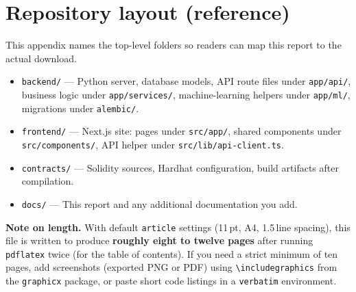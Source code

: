 \documentclass[11pt,a4paper]{article}
\begin{document}
\appendix
\section{Repository layout (reference)}
This appendix names the top-level folders so readers can map this report to the actual download.

\begin{itemize}[leftmargin=*]
  \item \texttt{backend/} --- Python server, database models, API route files under \texttt{app/api/}, business logic under \texttt{app/services/}, machine-learning helpers under \texttt{app/ml/}, migrations under \texttt{alembic/}.
  \item \texttt{frontend/} --- Next.js site: pages under \texttt{src/app/}, shared components under \texttt{src/components/}, API helper under \texttt{src/lib/api-client.ts}.
  \item \texttt{contracts/} --- Solidity sources, Hardhat configuration, build artifacts after compilation.
  \item \texttt{docs/} --- This report and any additional documentation you add.
\end{itemize}

\noindent
\textbf{Note on length.} With default \texttt{article} settings (11\,pt, A4, 1.5\,line spacing), this file is written to produce \textbf{roughly eight to twelve pages} after running \texttt{pdflatex} twice (for the table of contents). If you need a strict minimum of ten pages, add screenshots (exported PNG or PDF) using \verb|\includegraphics| from the \texttt{graphicx} package, or paste short code listings in a \texttt{verbatim} environment.
\end{document}
